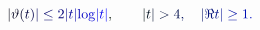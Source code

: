 \documentclass[12pt]{article}
\begin{document}
\makeatletter
\renewcommand*{\@textcolor}[3]{%
  \protect\leavevmode
  \begingroup
    \color#1{#2}#3%
  \endgroup
}
\makeatother
\begin{displaymath}
\mathcolor[RGB]{0,0,15}{|} \mathcolor[RGB]{0,0,30}{\vartheta} \mathcolor[RGB]{0,0,45}{(} \mathcolor[RGB]{0,0,60}{t} \mathcolor[RGB]{0,0,75}{)} \mathcolor[RGB]{0,0,90}{|} \mathcolor[RGB]{0,0,105}{\leq} \mathcolor[RGB]{0,0,120}{2} \mathcolor[RGB]{0,0,135}{|} \mathcolor[RGB]{0,0,150}{t} \mathcolor[RGB]{0,0,165}{|} \mathrm { \mathcolor[RGB]{0,0,180}{l} \mathcolor[RGB]{0,0,195}{o} \mathcolor[RGB]{0,0,210}{g} } \mathcolor[RGB]{0,0,225}{|} \mathcolor[RGB]{0,0,240}{t} \mathcolor[RGB]{0,0,255}{|} \mathcolor[RGB]{0,15,0}{,} \qquad \mathcolor[RGB]{0,15,15}{|} \mathcolor[RGB]{0,15,30}{t} \mathcolor[RGB]{0,15,45}{|} \mathcolor[RGB]{0,15,60}{>} \mathcolor[RGB]{0,15,75}{4} \mathcolor[RGB]{0,15,90}{,} \quad \mathcolor[RGB]{0,15,105}{|} \mathcolor[RGB]{0,15,120}{\Re} \mathcolor[RGB]{0,15,135}{t} \mathcolor[RGB]{0,15,150}{|} \mathcolor[RGB]{0,15,165}{\geq} \mathcolor[RGB]{0,15,180}{1} \mathcolor[RGB]{0,15,195}{.}
\end{displaymath}
\end{document}
